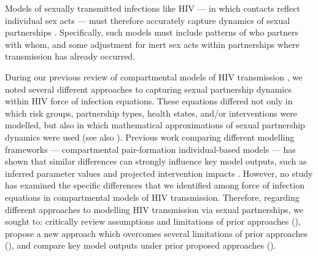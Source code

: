 Models of sexually transmitted infections like HIV
--- in which contacts reflect individual sex acts ---
must therefore accurately capture dynamics of sexual partnerships \cite{Rao2021}.
Specifically, such models must include patterns of who partners with whom, and
some adjustment for inert sex acts within partnerships where transmission has already occurred.
\par
During our previous review of compartmental models of HIV transmission \cite{Knight2022sr},
we noted several different approaches to capturing sexual partnership dynamics
within HIV force of infection equations.
These equations differed not only in which
risk groups, partnership types, health states, and/or interventions were modelled,
but also in which mathematical approximations of sexual partnership dynamics were used
(see also \cite{Rao2021}).
Previous work comparing different modelling frameworks
--- \ie compartmental \vs pair-formation \vs individual-based models ---
has shown that similar differences can strongly influence key model outputs,
such as inferred parameter values and projected intervention impacts
\cite{Kretzschmar1998,Eames2002,Lloyd-Smith2004,Johnson2016mf}.
However, no study has examined the specific differences that we identified
among force of infection equations in compartmental models of HIV transmission.
\clearpage %
Therefore, regarding different approaches to modelling HIV transmission via sexual partnerships,
we sought to:
critically review assumptions and limitations of prior approaches (),
propose a new approach which overcomes several limitations of prior approaches (),
and compare key model outputs under prior \vs proposed approaches ().
